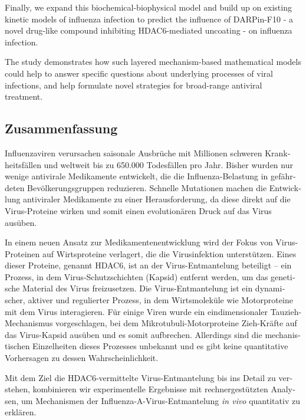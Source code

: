 Finally, we expand this biochemical-biophysical model and build up on existing kinetic models of influenza infection to predict the influence of DARPin-F10 - a novel drug-like compound inhibiting HDAC6-mediated uncoating - on influenza infection.

The study demonstrates how such layered mechanism-based mathematical models could help to answer specific questions about underlying processes of viral infections, and help formulate novel strategies for broad-range antiviral treatment.

\endgroup

\cleardoublepage%

\begingroup
\let\clearpage\relax
\let\cleardoublepage\relax
\let\cleardoublepage\relax

\begin{otherlanguage}{ngerman}
\chapter*{Zusammenfassung}


Influenzaviren verursachen saisonale Ausbrüche mit Millionen schweren Krankheitsfällen und weltweit bis zu 650.000 Todesfällen pro Jahr. Bisher wurden nur wenige antivirale Medikamente entwickelt, die die Influenza-Belastung in gefährdeten Bevölkerungsgruppen reduzieren. Schnelle Mutationen machen die Entwicklung antiviraler Medikamente zu einer Herausforderung, da diese direkt auf die Virus-Proteine wirken und somit einen evolutionären Druck auf das Virus ausüben.

In einem neuen Ansatz zur Medikamentenentwicklung wird der Fokus von Virus-Proteinen auf Wirtsproteine verlagert, die die Virusinfektion unterstützen. Eines dieser Proteine, genannt HDAC6, ist an der Virus-Entmantelung beteiligt – ein Prozess, in dem Virus-Schutzschichten (Kapsid) entfernt werden, um das genetische Material des Virus freizusetzen. Die Virus-Entmantelung ist ein dynamischer, aktiver und regulierter Prozess, in dem Wirtsmoleküle wie Motorproteine mit dem Virus interagieren. Für einige Viren wurde ein eindimensionaler Tauzieh-Mechanismus vorgeschlagen, bei dem Mikrotubuli-Motorproteine Zieh-Kräfte auf das Virus-Kapsid ausüben und es somit aufbrechen. Allerdings sind die mechanistischen Einzelheiten dieses Prozesses unbekannt und es gibt keine quantitative Vorhersagen zu dessen Wahrscheinlichkeit.

Mit dem Ziel die HDAC6-vermittelte Virus-Entmantelung bis ins Detail zu verstehen, kombinieren wir experimentelle Ergebnisse mit rechnergestützten Analysen, um Mechanismen der Influenza-A-Virus-Entmantelung \textit{in vivo} quantitativ zu erklären.  


\end{otherlanguage}
